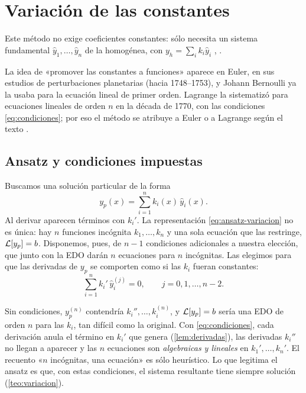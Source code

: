 \section{Variación de las constantes}\label{sec:variacion}

Este método no exige coeficientes constantes: sólo necesita un sistema
fundamental $\hat y_1,\dots,\hat y_n$ de la homogénea, con
$y_h=\sum_ik_i\hat y_i$ \cite[cap.~15]{RILEY}, \cite[cap.~IV]{TEMARIO}.

\begin{observacion}\label{obs:historia}
La idea de «promover las constantes a funciones» aparece en Euler, en sus
estudios de perturbaciones planetarias (hacia 1748--1753), y Johann
Bernoulli ya la usaba para la ecuación lineal de primer orden. Lagrange la
sistematizó para ecuaciones lineales de orden $n$ en la década de 1770,
con las condiciones \eqref{eq:condiciones}; por eso el método se atribuye
a Euler o a Lagrange según el texto \cite{KLINE}.
\end{observacion}

\subsection{Ansatz y condiciones impuestas}\label{sec:ansatz-variacion}
Buscamos una solución particular de la forma
\begin{equation}\label{eq:ansatz-variacion}
  y_p(x)=\sum_{i=1}^{n}k_i(x)\,\hat y_i(x).
\end{equation}
Al derivar aparecen términos con $k_i'$. La representación
\eqref{eq:ansatz-variacion} no es única: hay $n$ funciones incógnita
$k_1,\dots,k_n$ y una sola ecuación que las restringe, $\mathcal{L}[y_p]=b$.
Disponemos, pues, de $n-1$ condiciones adicionales a nuestra elección,
que junto con la EDO darán $n$ ecuaciones para $n$ incógnitas. Las
elegimos para que las derivadas de $y_p$ se comporten como si las $k_i$
fueran constantes:
\begin{equation}\label{eq:condiciones}
  \sum_{i=1}^{n}k_i'\,\hat y_i^{(j)}=0,\qquad j=0,1,\dots,n-2 .
\end{equation}

\begin{idea}
Sin condiciones, $y_p^{(n)}$ contendría $k_i'',\dots,k_i^{(n)}$, y
$\mathcal{L}[y_p]=b$ sería una EDO de orden $n$ para las $k_i$, tan difícil como
la original. Con \eqref{eq:condiciones}, cada derivación anula el término
en $k_i'$ que genera (\cref{lem:derivadas}), las derivadas $k_i''$ no
llegan a aparecer y las $n$ ecuaciones son \emph{algebraicas y lineales}
en $k_1',\dots,k_n'$. El recuento «$n$ incógnitas, una ecuación» es sólo
heurístico. Lo que legitima el ansatz es que, con estas condiciones, el
sistema resultante tiene siempre solución (\cref{teo:variacion}).
\end{idea}

